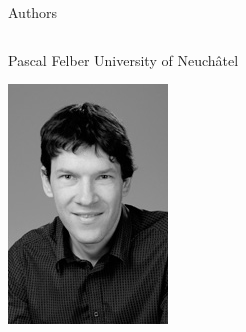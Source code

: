 \documentclass[presentation]{beamer}
\begin{document}
\begin{frame}[label={sec:orgadbd897}]{Authors}
\begin{block}{}
\begin{columns}
\begin{column}{0.2\columnwidth}
\begin{block}{Pascal Felber}
University of Neuchâtel\\
\begin{center}
\includegraphics[width=.9\linewidth]{./IMGs/pascal.jpg}
\end{center}
\end{block}
\end{column}


\end{columns}
\end{block}
\end{frame}
\end{document}
